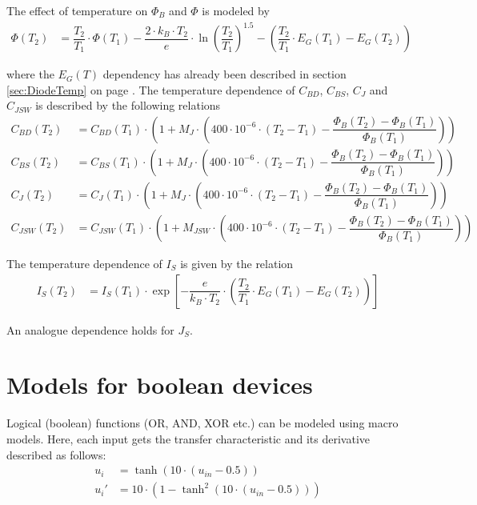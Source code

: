 The effect of temperature on $\Phi_B$ and $\Phi$ is modeled by
\begin{align}
\Phi\left(T_2\right)  &= \dfrac{T_2}{T_1}\cdot \Phi\left(T_1\right) - \dfrac{2\cdot k_B\cdot T_2}{e} \cdot \ln{\left(\dfrac{T_2}{T_1}\right)^{1.5}} - \left(\dfrac{T_2}{T_1} \cdot E_G\left(T_1\right) - E_G\left(T_2\right)\right)
\end{align}

where the $E_G\left(T\right)$ dependency has already been described in
section \ref{sec:DiodeTemp} on page \pageref{sec:DiodeTemp}.  The
temperature dependence of $C_{BD}$, $C_{BS}$, $C_{J}$ and $C_{JSW}$ is
described by the following relations
\begin{align}
C_{BD}\left(T_2\right) &= C_{BD}\left(T_1\right)\cdot\left(1 + M_J\cdot\left(400\cdot 10^{-6} \cdot\left(T_2 - T_1\right) - \dfrac{\Phi_B\left(T_2\right) - \Phi_B\left(T_1\right)}{\Phi_B\left(T_1\right)}\right)\right)\\
C_{BS}\left(T_2\right) &= C_{BS}\left(T_1\right)\cdot\left(1 + M_J\cdot\left(400\cdot 10^{-6} \cdot\left(T_2 - T_1\right) - \dfrac{\Phi_B\left(T_2\right) - \Phi_B\left(T_1\right)}{\Phi_B\left(T_1\right)}\right)\right)\\
C_{J}\left(T_2\right) &= C_{J}\left(T_1\right)\cdot\left(1 + M_J\cdot\left(400\cdot 10^{-6} \cdot\left(T_2 - T_1\right) - \dfrac{\Phi_B\left(T_2\right) - \Phi_B\left(T_1\right)}{\Phi_B\left(T_1\right)}\right)\right)\\
C_{JSW}\left(T_2\right) &= C_{JSW}\left(T_1\right)\cdot\left(1 + M_{JSW}\cdot\left(400\cdot 10^{-6} \cdot\left(T_2 - T_1\right) - \dfrac{\Phi_B\left(T_2\right) - \Phi_B\left(T_1\right)}{\Phi_B\left(T_1\right)}\right)\right)
\end{align}

The temperature dependence of $I_S$ is given by the relation
\begin{align}
I_S\left(T_2\right) &= I_S\left(T_1\right)\cdot \exp{\left[-\dfrac{e}{k_B\cdot T_2}\cdot \left(\dfrac{T_2}{T_1}\cdot E_G\left(T_1\right) - E_G\left(T_2\right)\right)\right]}
\end{align}

An analogue dependence holds for $J_S$.


\section{Models for boolean devices}
\label{sec:DClogic}

Logical (boolean) functions (OR, AND, XOR etc.) can be modeled using
macro models.  Here, each input gets the transfer characteristic and
its derivative described as follows:
\begin{align}
u_i  & = \tanh (10\cdot (u_{in} - 0.5)) \\
u_i' & = 10\cdot \left( 1- \tanh^2 (10\cdot (u_{in} - 0.5)) \right)
\end{align}

